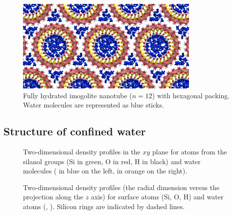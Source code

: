 \documentclass[thesis]{subfiles}
\begin{document}
\begin{figure}[ht]
	\centering
	\includegraphics[width=0.8\textwidth]{figures/images/imogolite-gcmc-result}
	\caption{Fully hydrated imogolite nanotube ($n=12$) with hexagonal packing. Water molecules are represented as blue sticks.}
    \label{fig:imogolite:gcmc-result}
\end{figure}

\subsection{Structure of confined water}

\begin{figure}[ht]
    \centering
    
    \caption{Two-dimensional density profiles in the $xy$ plane for atoms from
    the silanol groups (Si in green, O in red, H in black) and water molecules
    ( in blue on the left,  in orange on the right).}
    \label{fig:imogolite:density:xy}
\end{figure}

\begin{figure}[ht]
    \centering
    
    \caption{Two-dimensional density profiles (the radial dimension versus the
    projection along the $z$ axis) for surface atoms (Si, O, H) and water atoms
    (, ). Silicon rings are indicated by dashed lines.}
    \label{fig:imogolite:density:rz}
\end{figure}
\end{document}
